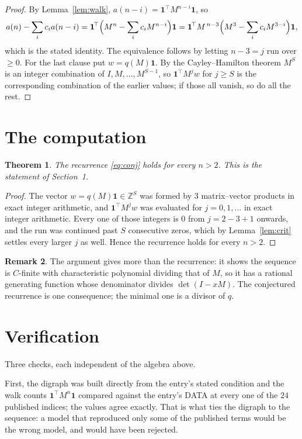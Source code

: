 \documentclass[11pt,a4paper]{article}
\theoremstyle{plain}
\newtheorem{theorem}{Theorem}
\theoremstyle{definition}
\newtheorem{remark}[theorem]{Remark}
\begin{document}
\begin{proof}
By Lemma~\ref{lem:walk}, $a(n-i)=\mathbf{1}^{\!\top}M^{n-i}\mathbf{1}$, so
\[
a(n)-\sum_i c_i a(n-i)
=\mathbf{1}^{\!\top}\Bigl(M^{n}-\sum_i c_i M^{n-i}\Bigr)\mathbf{1}
=\mathbf{1}^{\!\top}M^{\,n-3}\Bigl(M^{3}-\sum_i c_i M^{3-i}\Bigr)\mathbf{1},
\]
which is the stated identity. The equivalence follows by letting $n-3=j$ run over
$\ge0$. For the last clause put $w=q(M)\mathbf{1}$. By the Cayley--Hamilton theorem
$M^{S}$ is an integer combination of $I,M,\dots,M^{S-1}$, so
$\mathbf{1}^{\!\top}M^{j}w$ for $j\ge S$ is the corresponding combination of the
earlier values; if those all vanish, so do all the rest.
\end{proof}

\section{The computation}

\begin{theorem}
The recurrence \eqref{eq:conj} holds for every $n>2$. This is the statement of
Section~1.
\end{theorem}

\begin{proof}
The vector $w=q(M)\mathbf{1}\in\mathbb{Z}^{S}$ was formed by $3$ matrix--vector
products in exact integer arithmetic, and $\mathbf{1}^{\!\top}M^{j}w$ was evaluated for
$j=0,1,\dots$ in exact integer arithmetic. Every one of those integers is $0$ from
$j=2-3+1$ onwards, and the run was continued past $S$ consecutive zeros, which by
Lemma~\ref{lem:crit} settles every larger $j$ as well. Hence the recurrence holds for
every $n>2$.
\end{proof}

\begin{remark}
The argument gives more than the recurrence: it shows the sequence is $C$-finite with
characteristic polynomial dividing that of $M$, so it has a rational generating function
whose denominator divides $\det(I-xM)$. The conjectured recurrence is one consequence; the
minimal one is a divisor of $q$.
\end{remark}

\section{Verification}

Three checks, each independent of the algebra above.

First, the digraph was built directly from the entry's stated condition and the walk counts
$\mathbf{1}^{\!\top}M^{n}\mathbf{1}$ compared against the entry's DATA at every one of
the $24$ published indices; the values agree exactly. That is what ties the digraph to
the sequence: a model that reproduced only some of the published terms would be the wrong
model, and would have been rejected.
\end{document}
